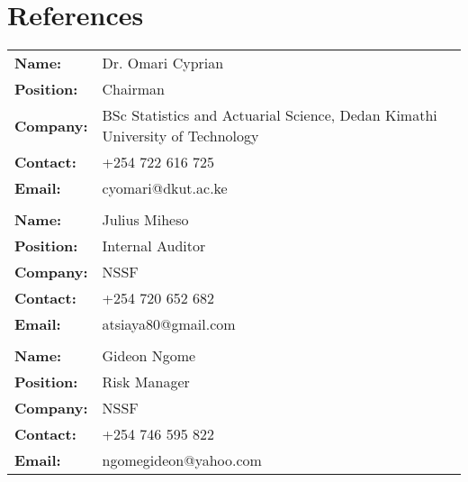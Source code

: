 \documentclass[11pt,a4paper,sans,english]{moderncv}        %
\begin{document}
\section{References}
\begin{center}
	\begin{tabular}{p{6cm}p{8cm}}
		\textbf{Name:} & Dr. Omari Cyprian \\
		\textbf{Position:} & Chairman \\
		\textbf{Company:} & BSc Statistics and Actuarial Science, Dedan Kimathi University of Technology \\
		\textbf{Contact:} & +254 722 616 725 \\
		\textbf{Email:} & cyomari@dkut.ac.ke \\
		\\
		\textbf{Name:} & Julius Miheso \\
		\textbf{Position:} & Internal Auditor \\
		\textbf{Company:} & NSSF \\
		\textbf{Contact:} & +254 720 652 682 \\
		\textbf{Email:} & atsiaya80@gmail.com \\
		\\
		\textbf{Name:} & Gideon Ngome \\
		\textbf{Position:} & Risk Manager \\
		\textbf{Company:} & NSSF \\
		\textbf{Contact:} & +254 746 595 822 \\
		\textbf{Email:} & ngomegideon@yahoo.com \\
	\end{tabular}
\end{center}
\end{document}
